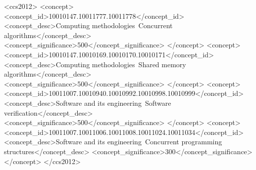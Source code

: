 \usepackage[utf8]{inputenc}
\usepackage[T1]{fontenc}


\usepackage{boolean}



\usepackage[dvipsnames,svgnames]{xcolor}


\begin{CCSXML}
<ccs2012>
   <concept>
       <concept_id>10010147.10011777.10011778</concept_id>
       <concept_desc>Computing methodologies~Concurrent algorithms</concept_desc>
       <concept_significance>500</concept_significance>
       </concept>
   <concept>
       <concept_id>10010147.10010169.10010170.10010171</concept_id>
       <concept_desc>Computing methodologies~Shared memory algorithms</concept_desc>
       <concept_significance>500</concept_significance>
       </concept>
   <concept>
       <concept_id>10011007.10010940.10010992.10010998.10010999</concept_id>
       <concept_desc>Software and its engineering~Software verification</concept_desc>
       <concept_significance>500</concept_significance>
       </concept>
   <concept>
       <concept_id>10011007.10011006.10011008.10011024.10011034</concept_id>
       <concept_desc>Software and its engineering~Concurrent programming structures</concept_desc>
       <concept_significance>300</concept_significance>
       </concept>
 </ccs2012>
\end{CCSXML}




\makeatletter
\renewcommand*{\fps@figure}{tp}
\makeatother


\usepackage{graphicx}


\usepackage{float}

\usepackage{caption}
\usepackage{subcaption}


